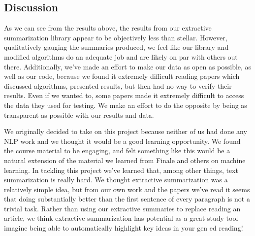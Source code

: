 \documentclass[10pt]{article}
\begin{document}
\subsection{Discussion}
As we can see from the results above, the results from our extractive summarization library appear to be objectively less than stellar. However, qualitatively gauging the summaries produced, we feel like our library and modified algorithms do an adequate job and are likely on par with others out there. Additionally, we've made an effort to make our data as open as possible, as well as our code, because we found it extremely difficult reading papers which discussed algorithms, presented results, but then had no way to verify their results. Even if we wanted to, some papers made it extremely difficult to access the data they used for testing. We make an effort to do the opposite by being as transparent as possible with our results and data.

We originally decided to take on this project because neither of us had done any NLP work and we thought it would be a good learning opportunity. We found the course material to be engaging, and felt something like this would be a natural extension of the material we learned from Finale and others on machine learning. In tackling this project we've learned that, among other things, text summarization is really hard. We thought extractive summarization was a relatively simple idea, but from our own work and the papers we've read it seems that doing substantially better than the first sentence of every paragraph is not a trivial task. Rather than using our extractive summaries to replace reading an article, we think extractive summarization has potential as a great study tool-imagine being able to automatically highlight key ideas in your gen ed reading!
\end{document}
